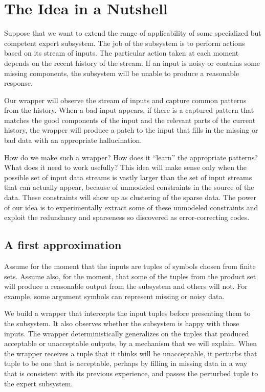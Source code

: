 \documentclass[letterpaper]{article}
\begin{document}
\section{The Idea in a Nutshell}

Suppose that we want to extend the range of applicability of some
specialized but competent expert subsystem.  The job of the subsystem
is to perform actions based on its stream of inputs.  The particular
action taken at each moment depends on the recent history of the
stream.  If an input is noisy or contains some missing components, the
subsystem will be unable to produce a reasonable response.

Our wrapper will observe the stream of inputs and capture common
patterns from the history.  When a bad input appears, if there is a
captured pattern that matches the good components of the input and the
relevant parts of the current history, the wrapper will produce a
patch to the input that fills in the missing or bad data with an
appropriate hallucination.

How do we make such a wrapper?  How does it ``learn'' the appropriate
patterns?  What does it need to work usefully?  This idea will make
sense only when the possible set of input data streams is vastly
larger than the set of input streams that can actually appear, because
of unmodeled constraints in the source of the data.  These constraints
will show up as clustering of the sparse data.  The power of our idea
is to experimentally extract some of these unmodeled constraints and
exploit the redundancy and sparseness so discovered as
error-correcting codes.


\subsection{A first approximation}

Assume for the moment that the inputs are tuples of symbols chosen
from finite sets.  Assume also, for the moment, that some of the
tuples from the product set will produce a reasonable output from the
subsystem and others will not.  For example, some argument symbols can
represent missing or noisy data.

We build a wrapper that intercepts the input tuples before presenting
them to the subsystem.  It also observes whether the subsystem is
happy with those inputs.  The wrapper deterministically generalizes on
the tuples that produced acceptable or unacceptable outputs, by a
mechanism that we will explain.  When the wrapper receives a tuple
that it thinks will be unacceptable, it perturbs that tuple to be one
that is acceptable, perhaps by filling in missing data in a way that
is consistent with its previous experience, and passes the perturbed
tuple to the expert subsystem.
\end{document}

